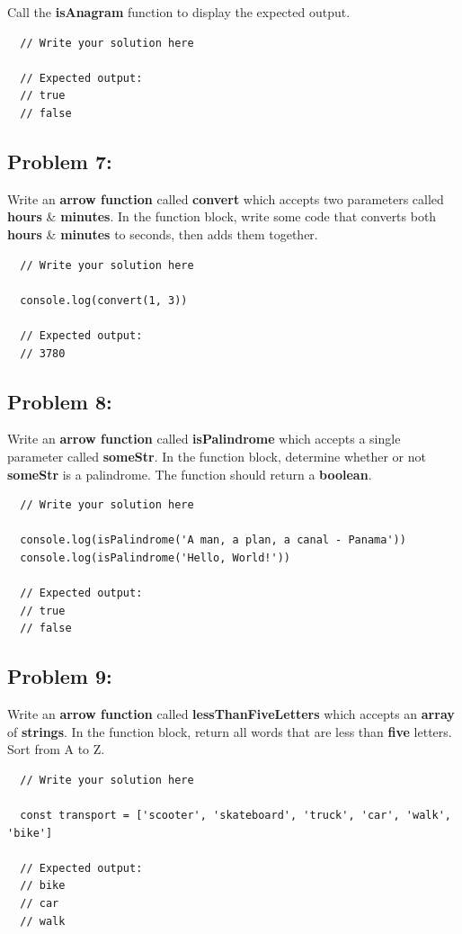 \documentclass{article}
\begin{document}
Call the \textbf{isAnagram} function to display the expected output.

\begin{verbatim}
  // Write your solution here

  // Expected output:
  // true
  // false
\end{verbatim}

\subsection*{Problem 7:}
Write an \textbf{arrow function} called \textbf{convert} which accepts two parameters called \textbf{hours} \& \textbf{minutes}. In the function block, write some code that converts both \textbf{hours} \& \textbf{minutes} to seconds, then adds them together.

\begin{verbatim}
  // Write your solution here

  console.log(convert(1, 3))

  // Expected output:
  // 3780
\end{verbatim}

\subsection*{Problem 8:}
Write an \textbf{arrow function} called \textbf{isPalindrome} which accepts a single parameter called \textbf{someStr}. In the function block, determine whether or not \textbf{someStr} is a palindrome. The function should return a \textbf{boolean}.

\begin{verbatim}
  // Write your solution here

  console.log(isPalindrome('A man, a plan, a canal - Panama'))
  console.log(isPalindrome('Hello, World!'))

  // Expected output:
  // true
  // false
\end{verbatim}
 
\subsection*{Problem 9:}
Write an \textbf{arrow function} called \textbf{lessThanFiveLetters} which accepts an \textbf{array} of \textbf{strings}. In the function block, return all words that are less than \textbf{five} letters. Sort from A to Z.

\begin{verbatim} 
  // Write your solution here

  const transport = ['scooter', 'skateboard', 'truck', 'car', 'walk', 'bike']

  // Expected output:
  // bike
  // car
  // walk
\end{verbatim}
\end{document}
